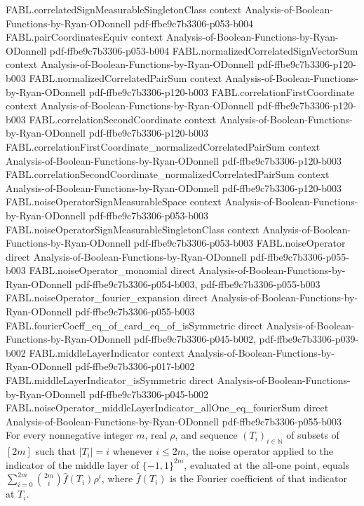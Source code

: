\begin{theorem}
\proofstep
  {FABL.correlatedSignMeasurableSingletonClass}
  {context}
  {Analysis-of-Boolean-Functions-by-Ryan-ODonnell}
  {pdf-ffbe9c7b3306-p053-b004}
\proofstep
  {FABL.pairCoordinatesEquiv}
  {context}
  {Analysis-of-Boolean-Functions-by-Ryan-ODonnell}
  {pdf-ffbe9c7b3306-p053-b004}
\proofstep
  {FABL.normalizedCorrelatedSignVectorSum}
  {context}
  {Analysis-of-Boolean-Functions-by-Ryan-ODonnell}
  {pdf-ffbe9c7b3306-p120-b003}
\proofstep
  {FABL.normalizedCorrelatedPairSum}
  {context}
  {Analysis-of-Boolean-Functions-by-Ryan-ODonnell}
  {pdf-ffbe9c7b3306-p120-b003}
\proofstep
  {FABL.correlationFirstCoordinate}
  {context}
  {Analysis-of-Boolean-Functions-by-Ryan-ODonnell}
  {pdf-ffbe9c7b3306-p120-b003}
\proofstep
  {FABL.correlationSecondCoordinate}
  {context}
  {Analysis-of-Boolean-Functions-by-Ryan-ODonnell}
  {pdf-ffbe9c7b3306-p120-b003}
\proofstep
  {FABL.correlationFirstCoordinate_normalizedCorrelatedPairSum}
  {context}
  {Analysis-of-Boolean-Functions-by-Ryan-ODonnell}
  {pdf-ffbe9c7b3306-p120-b003}
\proofstep
  {FABL.correlationSecondCoordinate_normalizedCorrelatedPairSum}
  {context}
  {Analysis-of-Boolean-Functions-by-Ryan-ODonnell}
  {pdf-ffbe9c7b3306-p120-b003}
\proofstep
  {FABL.noiseOperatorSignMeasurableSpace}
  {context}
  {Analysis-of-Boolean-Functions-by-Ryan-ODonnell}
  {pdf-ffbe9c7b3306-p053-b003}
\proofstep
  {FABL.noiseOperatorSignMeasurableSingletonClass}
  {context}
  {Analysis-of-Boolean-Functions-by-Ryan-ODonnell}
  {pdf-ffbe9c7b3306-p053-b003}
\proofstep
  {FABL.noiseOperator}
  {direct}
  {Analysis-of-Boolean-Functions-by-Ryan-ODonnell}
  {pdf-ffbe9c7b3306-p055-b003}
\proofstep
  {FABL.noiseOperator_monomial}
  {direct}
  {Analysis-of-Boolean-Functions-by-Ryan-ODonnell}
  {pdf-ffbe9c7b3306-p054-b003,
    pdf-ffbe9c7b3306-p055-b003}
\proofstep
  {FABL.noiseOperator_fourier_expansion}
  {direct}
  {Analysis-of-Boolean-Functions-by-Ryan-ODonnell}
  {pdf-ffbe9c7b3306-p055-b003}
\proofstep
  {FABL.fourierCoeff_eq_of_card_eq_of_isSymmetric}
  {direct}
  {Analysis-of-Boolean-Functions-by-Ryan-ODonnell}
  {pdf-ffbe9c7b3306-p045-b002,
    pdf-ffbe9c7b3306-p039-b002}
\proofstep
  {FABL.middleLayerIndicator}
  {context}
  {Analysis-of-Boolean-Functions-by-Ryan-ODonnell}
  {pdf-ffbe9c7b3306-p017-b002}
\proofstep
  {FABL.middleLayerIndicator_isSymmetric}
  {direct}
  {Analysis-of-Boolean-Functions-by-Ryan-ODonnell}
  {pdf-ffbe9c7b3306-p045-b002}
\proofstep
  {FABL.noiseOperator_middleLayerIndicator_allOne_eq_fourierSum}
  {direct}
  {Analysis-of-Boolean-Functions-by-Ryan-ODonnell}
  {pdf-ffbe9c7b3306-p055-b003}
For every nonnegative integer $m$, real $\rho$, and sequence $(T_i)_{i\in\mathbb N}$ of
subsets of $[2m]$ such that $|T_i|=i$ whenever $i\le 2m$, the noise operator applied to
the indicator of the middle layer of $\{−1,1\}^{2m}$, evaluated at the all-one point,
equals $\displaystyle\sum_{i=0}^{2m}\binom{2m}{i}\widehat f(T_i)\rho^i$, where $\widehat
f(T_i)$ is the Fourier coefficient of that indicator at $T_i$.
\end{theorem}

